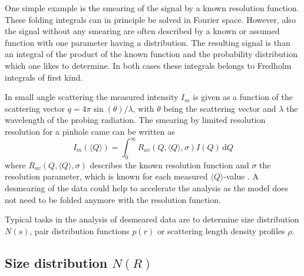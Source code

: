 One simple example is the smearing of the signal by a known resolution function. These folding integrals can in principle be solved in Fourier space. However, also the signal without any smearing are often described by a known or assumed function with one parameter having a distribution. The resulting signal is than an integral of the product of the known function and the probability distribution which one likes to determine. In both cases these integrals belongs to Fredholm integrals of first kind.

In small angle scattering the measured intensity $I_m$ is given as a function of the scattering vector $q=4\pi\sin(\theta)/\lambda$, with $\theta$ being the scattering vector and $\lambda$ the wavelength of the probing radiation. The smearing by limited resolution resolution for a pinhole came can be written as
\begin{equation} \label{eq:res}
I_m(\langle Q\rangle) = \int_0^\infty R_{av}\left(Q,\langle
Q\rangle,\sigma\right) I(Q) \, \mathrm{d}Q
\end{equation}
where $R_{av}\left(Q,\langle Q\rangle,\sigma\right)$ describes the known resolution function and $\sigma$ the resolution parameter, which is known for each measured $\langle Q\rangle$-value \cite{Pedersen1990}. A desmearing of the data could help to accelerate the analysis as the model does not need to be folded anymore with the resolution function.

Typical tasks in the analysis of desmeared data are to determine size distribution $N(s)$, pair distribution functions $p(r)$ or scattering length density profiles $\rho$.

\subsection{Size distribution $N(R)$}
\label{sec:N(R)}

